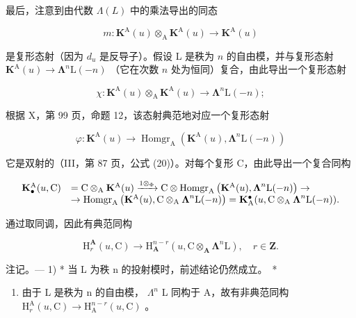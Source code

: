 最后，注意到由代数 \(\Lambda(L)\) 中的乘法导出的同态

\[
m: \mathbf {K} ^ {\mathrm{A}} (u) \otimes_ {\mathrm{A}} \mathbf {K} ^ {\mathrm{A}} (u) \rightarrow \mathbf {K} ^ {\mathrm{A}} (u)
\]

是复形态射（因为 \(d_{u}\) 是反导子）。假设 L 是秩为 \(n\) 的自由模，并与复形态射 \(\mathbf{K}^{\mathrm{A}}(u)\to\symbf{\Lambda}^{n}\mathrm{L}(-n)\) （它在次数 \(n\) 处为恒同）复合，由此导出一个复形态射

\[
\chi : \mathbf {K} ^ {\mathrm{A}} (u) \otimes_ {\mathrm{A}} \mathbf {K} ^ {\mathrm{A}} (u) \rightarrow \boldsymbol {\Lambda} ^ {n} \mathrm{L} (- n);
\]

根据 X，第 99 页，命题 12，该态射典范地对应一个复形态射

\[
\varphi : \mathbf {K} ^ {\mathrm{A}} (u) \rightarrow \operatorname{Homgr} _ {\mathrm{A}} \left(\mathbf {K} ^ {\mathrm{A}} (u), \boldsymbol {\Lambda} ^ {n} \mathrm{L} (- n)\right)
\]

它是双射的（III，第 87 页，公式 (20)）。对每个复形 C，由此导出一个复合同构

\[
\begin{array}{r l} \mathbf {K} _ {\bullet} ^ {\mathrm{A}} (u, \mathrm{C}) & = \mathrm{C} \otimes_ {\mathrm{A}} \mathbf {K} ^ {\mathrm{A}} (u) \xrightarrow {1 \otimes_ {\Phi}} \mathrm{C} \otimes \operatorname{Homgr} _ {\mathrm{A}} \left(\mathbf {K} ^ {\mathrm{A}} (u), \boldsymbol {\Lambda} ^ {n} \mathrm{L} (- n)\right) \to \\ & \to \operatorname{Homgr} _ {\mathrm{A}} \left(\mathbf {K} ^ {\mathrm{A}} (u), \mathrm{C} \otimes_ {\mathrm{A}} \boldsymbol {\Lambda} ^ {n} \mathrm{L} (- n)\right) = \mathbf {K} _ {\mathrm{A}} ^ {\bullet} (u, \mathrm{C} \otimes_ {\mathrm{A}} \boldsymbol {\Lambda} ^ {n} \mathrm{L} (- n)). \end{array}
\]

通过取同调，因此有典范同构

\[
\mathrm{H} _ {r} ^ {\mathbf {A}} (u, \mathrm{C}) \rightarrow \mathrm{H} _ {\mathbf {A}} ^ {n - r} (u, \mathrm{C} \otimes_ {\mathbf {A}} \boldsymbol {\Lambda} ^ {n} \mathrm{L}), \quad r \in \mathbf {Z}.\tag{8}
\]

注记。--- 1) * 当 L 为秩 n 的投射模时，前述结论仍然成立。~*

\begin{enumerate}
\def\labelenumi{\arabic{enumi})}
\setcounter{enumi}{1}
\tightlist
\item
  由于 L 是秩为 n 的自由模， \(\Lambda^{n}\) L 同构于 A，故有非典范同构 \(\mathrm{H}_{r}^{\mathrm{A}}(u,\mathrm{C})\to\mathrm{H}_{\mathrm{A}}^{n-r}(u,\mathrm{C})\) 。
\end{enumerate}

